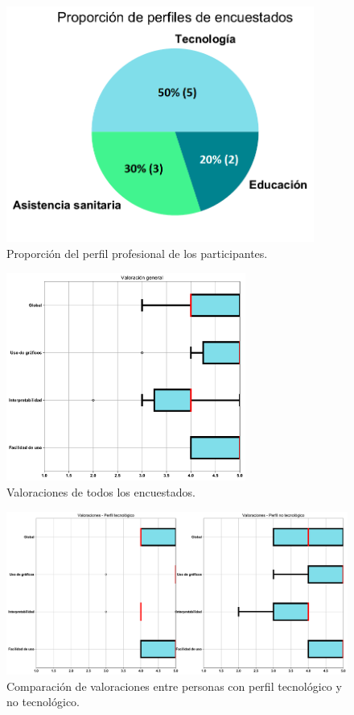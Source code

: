 \begin{figure}
	\centering
	\includegraphics[width=0.9\textwidth]{../img/mobile_proportion.png}
	\caption{Proporción del perfil profesional de los participantes.}
	\label{fig:mobile_proportion}
\end{figure}

\begin{figure}
	\centering
	\includegraphics[width=0.7\textwidth]{../img/mobile_general.pdf}
	\caption{Valoraciones de todos los encuestados.}
	\label{fig:mobile_general}
\end{figure}

\begin{figure}
	\centering
	\includegraphics[width=1\textwidth]{../img/mobile_comparation.pdf}
	\caption{Comparación de valoraciones entre personas con perfil tecnológico y no tecnológico.}
	\label{fig:mobile_comparation}
\end{figure}

